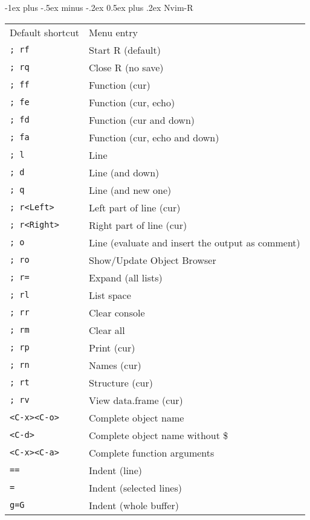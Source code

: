 \documentclass[10pt,landscape]{article}
\makeatletter
\renewcommand{\section}{\@startsection{section}{1}{0mm}%
                                {-1ex plus -.5ex minus -.2ex}%
                                {0.5ex plus .2ex}%
                                {\normalfont\large\bfseries}}
\makeatother
\begin{document}
\begin{multicols}{3}
\section{Nvim-R}
\begin{tabular}{@{}p{\the\MyLen}@{}p{\linewidth-\the\MyLen}@{}}
    \hline \hline
   Default shortcut  & Menu entry       \\
   \verb|; rf|       & Start R (default)\\
   \verb|; rq|       & Close R (no save)\\
   \hline
   \verb|; ff|       & Function (cur)                       \\
   \verb|; fe|       & Function (cur, echo)                 \\
   \verb|; fd|       & Function (cur and down)              \\
   \verb|; fa|       & Function (cur, echo and down)        \\
   \hline
   \verb|; l|        & Line                                  \\
   \verb|; d|        & Line (and down)                       \\
   \verb|; q|        & Line (and new one)                    \\
   \verb|; r<Left>|  & Left part of line (cur)        \\
   \verb|; r<Right>| & Right part of line (cur)       \\
   \verb|; o|        & Line (evaluate and insert the output as comment)  \\
   \hline
   \verb|; ro|       & Show/Update Object Browser        \\
   \verb|; r=|       & Expand (all lists)                \\
   \hline
   \verb|; rl|       & List space             \\
   \verb|; rr|       & Clear console          \\
   \verb|; rm|       & Clear all              \\
   \verb|; rp|       & Print (cur)            \\
   \verb|; rn|       & Names (cur)            \\
   \verb|; rt|       & Structure (cur)        \\
   \verb|; rv|       & View data.frame (cur)  \\
   \hline
   \verb|<C-x><C-o>| & Complete object name              \\
   \verb|<C-d>|      & Complete object name without \$   \\
   \verb|<C-x><C-a>| & Complete function arguments       \\
   \verb|==|         & Indent (line)                     \\
   \verb|=|          & Indent (selected lines)           \\
   \verb|g=G|        & Indent (whole buffer)             \\
    \hline \hline
\end{tabular}
\vfill

\end{multicols}
\end{document}
